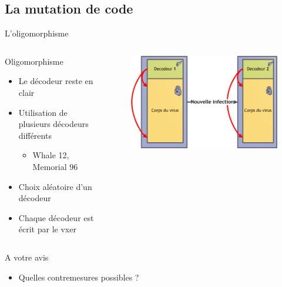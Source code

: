 \documentclass{beamer}
\begin{document}
\subsection{La mutation de code}
\begin{frame}{L'oligomorphisme}
\begin{columns}[t]
\begin{column}{5cm}
\begin{exampleblock}{Oligomorphisme}
\begin{itemize}
\item Le décodeur reste en clair
\item Utilisation de plusieurs décodeurs différents
\begin{itemize}
\item Whale 12, Memorial 96
\end{itemize}
\item Choix aléatoire d'un décodeur
\item Chaque décodeur est écrit par le vxer
\end{itemize}
\end{exampleblock}
\end{column}
\begin{column}{5cm}
\begin{figure}[!h]
\includegraphics[scale=0.3]{olligo.png}
\center
\end{figure}
\end{column}
\end{columns}
\end{frame}

\begin{frame}{A votre avis}
\begin{itemize}
\item \huge{Quelles contremesures possibles ?}
\end{itemize}
\end{frame}
\end{document}
